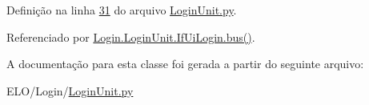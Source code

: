 Definição na linha \hyperlink{LoginUnit_8py_source_l00031}{31} do arquivo \hyperlink{LoginUnit_8py_source}{Login\-Unit.\-py}.



Referenciado por \hyperlink{classLogin_1_1LoginUnit_1_1IfUiLogin_abab63bd2085f485ca82494db8eb5f520}{Login.\-Login\-Unit.\-If\-Ui\-Login.\-bus()}.



A documentação para esta classe foi gerada a partir do seguinte arquivo\-:\begin{DoxyCompactItemize}
\item 
E\-L\-O/\-Login/\hyperlink{LoginUnit_8py}{Login\-Unit.\-py}\end{DoxyCompactItemize}
